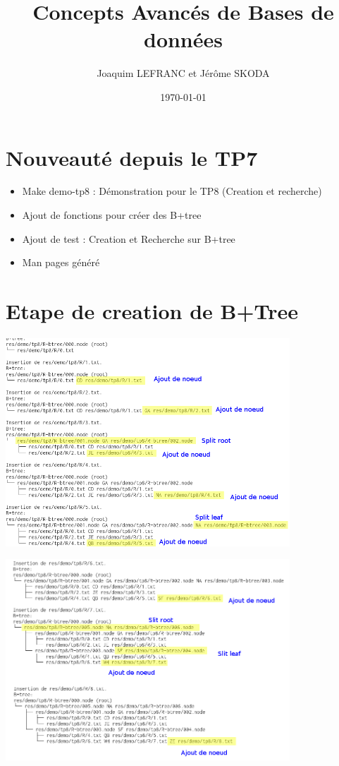 \documentclass[a4paper]{article}
\title{Concepts Avancés de Bases de données}
\author{Joaquim LEFRANC et Jérôme SKODA}
\date{\today}
\begin{document}
\maketitle


\section{Nouveauté depuis le TP7}

\begin{itemize}
  \item Make demo-tp8 : Démonstration pour le TP8 (Creation et recherche)
  \item Ajout de fonctions pour créer des B+tree
  \item Ajout de test : Creation et Recherche sur B+tree
  \item Man pages généré

\end{itemize}
\section{Etape de creation de B+Tree}


\includegraphics[width=0.8\textwidth]{btree-1.png}
\newline

\includegraphics[width=0.8\textwidth]{btree-2.png}
\end{document}
